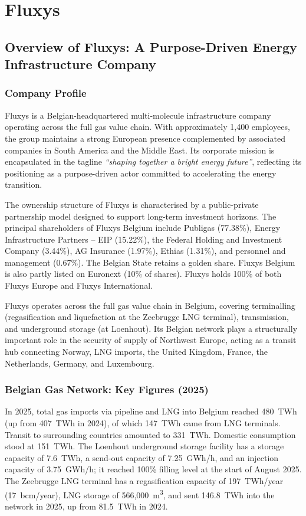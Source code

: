 \chapter{Fluxys}

\section{Overview of Fluxys: A Purpose-Driven Energy Infrastructure Company}

\subsection{Company Profile}

Fluxys is a Belgian-headquartered multi-molecule infrastructure company operating across the full gas value chain. With approximately 1,400 employees, the group maintains a strong European presence complemented by associated companies in South America and the Middle East. Its corporate mission is encapsulated in the tagline \textit{``shaping together a bright energy future''}, reflecting its positioning as a purpose-driven actor committed to accelerating the energy transition.

The ownership structure of Fluxys is characterised by a public-private partnership model designed to support long-term investment horizons. The principal shareholders of Fluxys Belgium include Publigas (77.38\%), Energy Infrastructure Partners -- EIP (15.22\%), the Federal Holding and Investment Company (3.44\%), AG Insurance (1.97\%), Ethias (1.31\%), and personnel and management (0.67\%). The Belgian State retains a golden share. Fluxys Belgium is also partly listed on Euronext (10\% of shares). Fluxys holds 100\% of both Fluxys Europe and Fluxys International.

Fluxys operates across the full gas value chain in Belgium, covering terminalling (regasification and liquefaction at the Zeebrugge LNG terminal), transmission, and underground storage (at Loenhout). Its Belgian network plays a structurally important role in the security of supply of Northwest Europe, acting as a transit hub connecting Norway, LNG imports, the United Kingdom, France, the Netherlands, Germany, and Luxembourg.

\subsection{Belgian Gas Network: Key Figures (2025)}

In 2025, total gas imports via pipeline and LNG into Belgium reached 480~TWh (up from 407~TWh in 2024), of which 147~TWh came from LNG terminals. Transit to surrounding countries amounted to 331~TWh. Domestic consumption stood at 151~TWh. The Loenhout underground storage facility has a storage capacity of 7.6~TWh, a send-out capacity of 7.25~GWh/h, and an injection capacity of 3.75~GWh/h; it reached 100\% filling level at the start of August 2025. The Zeebrugge LNG terminal has a regasification capacity of 197~TWh/year (17~bcm/year), LNG storage of 566,000~m\textsuperscript{3}, and sent 146.8~TWh into the network in 2025, up from 81.5~TWh in 2024.

